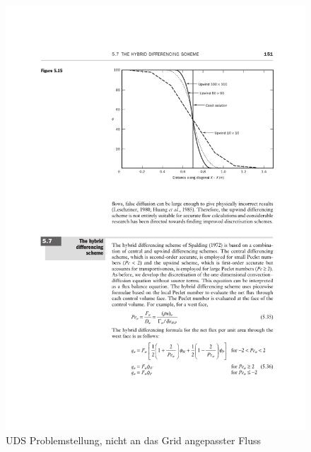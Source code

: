 \documentclass[a4paper]{scrartcl}
\begin{document}
\begin{figure}[h!]
\begin{center}
\includegraphics[scale=1.0]{images/53.pdf}
\caption{UDS Problemstellung, nicht an das Grid angepasster Fluss}
\label{fig:53}
\end{center}
\end{figure}
\end{document}
